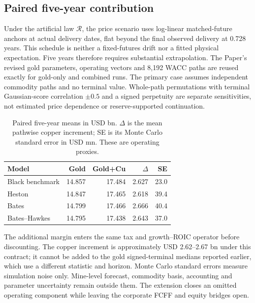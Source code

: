 \subsection{Paired five-year contribution}
Under the artificial law $\mathcal R$, the price scenario uses log-linear matched-future anchors at actual delivery dates, flat beyond the final observed delivery at 0.728 years. This schedule is neither a fixed-futures drift nor a fitted physical expectation. Five years therefore requires substantial extrapolation. The Paper's revised gold parameters, operating vectors and 8,192 WACC paths are reused exactly for gold-only and combined runs. The primary case assumes independent commodity paths and no terminal value. Whole-path permutations with terminal Gaussian-score correlation $\pm0.5$ and a signed perpetuity are separate sensitivities, not estimated price dependence or reserve-supported continuation.

\begin{table}[H]
\centering
\caption{Paired five-year means in USD bn. $\Delta$ is the mean pathwise copper increment; SE is its Monte Carlo standard error in USD mn. These are operating proxies.}
\begin{tabular}{@{}lrrrr@{}}
\toprule
Model & Gold & Gold+Cu & $\Delta$ & SE \\
\midrule
Black benchmark & 14.857 & 17.484 & 2.627 & 23.0 \\
Heston & 14.847 & 17.465 & 2.618 & 39.4 \\
Bates & 14.799 & 17.466 & 2.666 & 40.4 \\
Bates--Hawkes & 14.795 & 17.438 & 2.643 & 37.0 \\
\bottomrule
\end{tabular}
\label{tab:copper-paired}
\end{table}

The additional margin enters the same tax and growth--ROIC operator before discounting. The copper increment is approximately USD 2.62--2.67 bn under this contract; it cannot be added to the gold signed-terminal medians reported earlier, which use a different statistic and horizon. Monte Carlo standard errors measure simulation noise only. Mine-level forecast, commodity basis, accounting and parameter uncertainty remain outside them. The extension closes an omitted operating component while leaving the corporate FCFF and equity bridges open.

